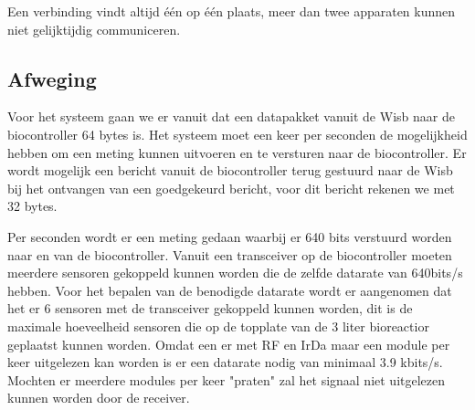 Een verbinding vindt altijd één op één plaats, meer dan twee apparaten kunnen niet gelijktijdig communiceren.

\subsection{Afweging}
\begin{table}[H]
	\centering
	\caption{Wireless module afwegingstabel}
	\label{tab:wisb_afweging}
\end{table}

Voor het systeem gaan we er vanuit dat een datapakket vanuit de Wisb naar de biocontroller 64 bytes is. Het systeem moet een keer per seconden de mogelijkheid hebben om een meting kunnen uitvoeren en te versturen naar de biocontroller. Er wordt mogelijk een bericht vanuit de biocontroller terug gestuurd naar de Wisb bij het ontvangen van een goedgekeurd bericht, voor dit bericht rekenen we met 32 bytes.

Per seconden wordt er een meting gedaan waarbij er 640 bits verstuurd worden naar en van de biocontroller. Vanuit een transceiver op de biocontroller moeten meerdere sensoren gekoppeld kunnen worden die de zelfde datarate van 640bits/s hebben. Voor het bepalen van de benodigde datarate wordt er aangenomen dat het er 6 sensoren met de transceiver gekoppeld kunnen worden, dit is de maximale hoeveelheid sensoren die op de topplate van de 3 liter bioreactior geplaatst kunnen worden. Omdat een er met RF en IrDa maar een module per keer uitgelezen kan worden is er een datarate nodig van minimaal 3.9 kbits/s. Mochten er meerdere modules per keer "praten" zal het signaal niet uitgelezen kunnen worden door de receiver.


